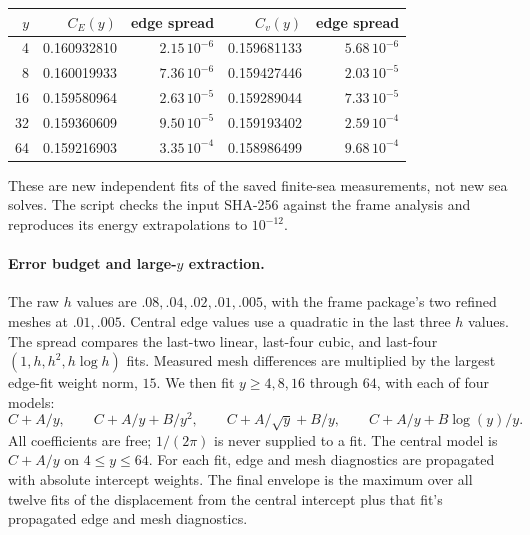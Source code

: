 \documentclass[11pt,a4paper]{article}
\begin{document}
\begin{center}\small
\begin{tabular}{rrrrr}
\toprule
$y$ & $C_E(y)$ & edge spread & $C_v(y)$ & edge spread\\\midrule
4 & 0.160932810 & $2.15\,10^{-6}$ & 0.159681133 & $5.68\,10^{-6}$\\
8 & 0.160019933 & $7.36\,10^{-6}$ & 0.159427446 & $2.03\,10^{-5}$\\
16 & 0.159580964 & $2.63\,10^{-5}$ & 0.159289044 & $7.33\,10^{-5}$\\
32 & 0.159360609 & $9.50\,10^{-5}$ & 0.159193402 & $2.59\,10^{-4}$\\
64 & 0.159216903 & $3.35\,10^{-4}$ & 0.158986499 & $9.68\,10^{-4}$\\
\bottomrule
\end{tabular}
\end{center}
These are new independent fits of the saved finite-sea measurements, not
new sea solves. The script checks the input SHA-256 against the frame
analysis and reproduces its energy extrapolations to $10^{-12}$.

\paragraph{Error budget and large-$y$ extraction.}
The raw $h$ values are $.08,.04,.02,.01,.005$, with the frame package's
two refined meshes at $.01,.005$. Central edge values use a quadratic in
the last three $h$ values. The spread compares the last-two linear,
last-four cubic, and last-four $(1,h,h^2,h\log h)$ fits. Measured mesh
differences are multiplied by the largest edge-fit weight norm, $15$.
We then fit $y\ge4,8,16$ through $64$, with each of four models:
\begin{equation}
 C+A/y,\qquad C+A/y+B/y^2,\qquad
 C+A/\sqrt y+B/y,\qquad C+A/y+B\log(y)/y.
\end{equation}
All coefficients are free; $1/(2\pi)$ is never supplied to a fit.
The central model is $C+A/y$ on $4\le y\le64$.
For each fit, edge and mesh diagnostics are propagated with absolute
intercept weights. The final envelope is the maximum over all twelve fits
of the displacement from the central intercept plus that fit's propagated
edge and mesh diagnostics.
\end{document}
